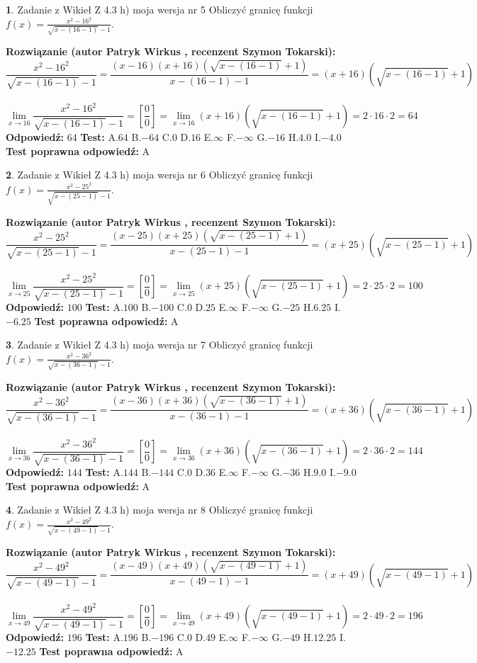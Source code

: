 \documentclass[12pt, a4paper]{article}
\theoremstyle{definition} %
\newtheorem{zad}{}
\newcommand{\zadStart}[1]{\begin{zad}#1\newline}
\newcommand{\zadStop}{\end{zad}}
\newcommand{\rozwStart}[2]{\noindent \textbf{Rozwiązanie (autor #1 , recenzent #2): }\newline}
\newcommand{\rozwStop}{\newline}
\newcommand{\odpStart}{\noindent \textbf{Odpowiedź:}\newline}
\newcommand{\odpStop}{\newline}
\newcommand{\testStart}{\noindent \textbf{Test:}\newline}
\newcommand{\testStop}{\newline}
\newcommand{\kluczStart}{\noindent \textbf{Test poprawna odpowiedź:}\newline}
\newcommand{\kluczStop}{\newline}
\begin{document}
\zadStart{Zadanie z Wikieł Z 4.3 h) moja wersja nr 5}
Obliczyć granicę funkcji $f(x)=\frac{x^{2} - 16^{2}}{\sqrt{x-(16-1)}-1}$.
\zadStop
\rozwStart{Patryk Wirkus}{Szymon Tokarski}
$$\frac{x^{2} - 16^{2}}{\sqrt{x-(16-1)}-1}=\frac{(x-16)(x+16)(\sqrt{x-(16-1)}+1)}{x-(16-1)-1}=(x+16)(\sqrt{x-(16-1)}+1)$$
\\
$$\lim\limits_{x\to 16}\frac{x^{2} - 16^{2}}{\sqrt{x-(16-1)}-1}=[\frac{0}{0}]=
\lim\limits_{x\to 16}(x+16)(\sqrt{x-(16-1)}+1) = 2\cdot16 \cdot 2 = 64$$
\rozwStop
\odpStart
$64$
\odpStop
\testStart
A.$64$
B.$-64$
C.$0$
D.$16$
E.$\infty$
F.$-\infty$
G.$-16$
H.$4.0$
I.$-4.0$
\testStop
\kluczStart
A
\kluczStop



\zadStart{Zadanie z Wikieł Z 4.3 h) moja wersja nr 6}
Obliczyć granicę funkcji $f(x)=\frac{x^{2} - 25^{2}}{\sqrt{x-(25-1)}-1}$.
\zadStop
\rozwStart{Patryk Wirkus}{Szymon Tokarski}
$$\frac{x^{2} - 25^{2}}{\sqrt{x-(25-1)}-1}=\frac{(x-25)(x+25)(\sqrt{x-(25-1)}+1)}{x-(25-1)-1}=(x+25)(\sqrt{x-(25-1)}+1)$$
\\
$$\lim\limits_{x\to 25}\frac{x^{2} - 25^{2}}{\sqrt{x-(25-1)}-1}=[\frac{0}{0}]=
\lim\limits_{x\to 25}(x+25)(\sqrt{x-(25-1)}+1) = 2\cdot25 \cdot 2 = 100$$
\rozwStop
\odpStart
$100$
\odpStop
\testStart
A.$100$
B.$-100$
C.$0$
D.$25$
E.$\infty$
F.$-\infty$
G.$-25$
H.$6.25$
I.$-6.25$
\testStop
\kluczStart
A
\kluczStop



\zadStart{Zadanie z Wikieł Z 4.3 h) moja wersja nr 7}
Obliczyć granicę funkcji $f(x)=\frac{x^{2} - 36^{2}}{\sqrt{x-(36-1)}-1}$.
\zadStop
\rozwStart{Patryk Wirkus}{Szymon Tokarski}
$$\frac{x^{2} - 36^{2}}{\sqrt{x-(36-1)}-1}=\frac{(x-36)(x+36)(\sqrt{x-(36-1)}+1)}{x-(36-1)-1}=(x+36)(\sqrt{x-(36-1)}+1)$$
\\
$$\lim\limits_{x\to 36}\frac{x^{2} - 36^{2}}{\sqrt{x-(36-1)}-1}=[\frac{0}{0}]=
\lim\limits_{x\to 36}(x+36)(\sqrt{x-(36-1)}+1) = 2\cdot36 \cdot 2 = 144$$
\rozwStop
\odpStart
$144$
\odpStop
\testStart
A.$144$
B.$-144$
C.$0$
D.$36$
E.$\infty$
F.$-\infty$
G.$-36$
H.$9.0$
I.$-9.0$
\testStop
\kluczStart
A
\kluczStop



\zadStart{Zadanie z Wikieł Z 4.3 h) moja wersja nr 8}
Obliczyć granicę funkcji $f(x)=\frac{x^{2} - 49^{2}}{\sqrt{x-(49-1)}-1}$.
\zadStop
\rozwStart{Patryk Wirkus}{Szymon Tokarski}
$$\frac{x^{2} - 49^{2}}{\sqrt{x-(49-1)}-1}=\frac{(x-49)(x+49)(\sqrt{x-(49-1)}+1)}{x-(49-1)-1}=(x+49)(\sqrt{x-(49-1)}+1)$$
\\
$$\lim\limits_{x\to 49}\frac{x^{2} - 49^{2}}{\sqrt{x-(49-1)}-1}=[\frac{0}{0}]=
\lim\limits_{x\to 49}(x+49)(\sqrt{x-(49-1)}+1) = 2\cdot49 \cdot 2 = 196$$
\rozwStop
\odpStart
$196$
\odpStop
\testStart
A.$196$
B.$-196$
C.$0$
D.$49$
E.$\infty$
F.$-\infty$
G.$-49$
H.$12.25$
I.$-12.25$
\testStop
\kluczStart
A
\kluczStop
\end{document}
